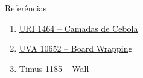 \begin{frame}[fragile]{Referências}

    \begin{enumerate}
        \item \href{https://www.urionlinejudge.com.br/judge/pt/problems/view/1464}{URI 1464 -- Camadas de Cebola}

        \item \href{https://uva.onlinejudge.org/index.php?option=com\_onlinejudge&Itemid=8&category=24&page=show\_problem&problem=1593}{UVA 10652 -- Board Wrapping}

        \item \href{http://acm.timus.ru/problem.aspx?space=1&num=1185}{Timus 1185 -- Wall}

    \end{enumerate}

\end{frame}
